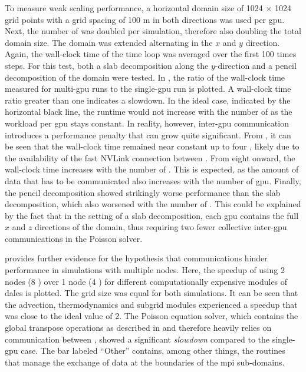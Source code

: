 To measure weak scaling performance, a horizontal domain size of 1024 $\times$ 1024 grid points with a grid spacing of 100 m in both directions was used per \acrshort{gpu}. Next, the number of  was doubled per simulation, therefore also doubling the total domain size. The domain was extended alternating in the $x$ and $y$ direction. Again, the wall-clock time of the time loop was averaged over the first 100 times steps. For this test, both a slab decomposition along the $y$-direction and a pencil decomposition of the domain were tested. In , the ratio of the wall-clock time measured for multi-\acrshort{gpu} runs to the single-\acrshort{gpu} run is plotted. A wall-clock time ratio greater than one indicates a slowdown. In the ideal case, indicated by the horizontal black line, the runtime would not increase with the number of  as the workload per \acrshort{gpu} stays constant. In reality, however, inter-\acrshort{gpu} communication introduces a performance penalty that can grow quite significant. From , it can be seen that the wall-clock time remained near constant up to four , likely due to the availability of the fast NVLink connection between . From eight  onward, the wall-clock time increases with the number of . This is expected, as the amount of data that has to be communicated also increases with the number of \acrshort{gpu}. Finally, the pencil decomposition showed strikingly worse performance than the slab decomposition, which also worsened with the number of . This could be explained by the fact that in the setting of a slab decomposition, each \acrshort{gpu} contains the full $x$ and $z$ directions of the domain, thus requiring two fewer collective inter-\acrshort{gpu} communications in the Poisson solver.

 provides further evidence for the hypothesis that communications hinder performance in simulations with multiple nodes. Here, the speedup of using 2 nodes (8 ) over 1 node (4 ) for different computationally expensive modules of \acrshort{dales} is plotted. The grid size was equal for both simulations. It can be seen that the advection, thermodynamics and subgrid modules experienced a speedup that was close to the ideal value of 2. The Poisson equation solver, which contains the global transpose operations as described in  and therefore heavily relies on communication between , showed a significant \emph{slowdown} compared to the single-\acrshort{gpu} case. The bar labeled ``Other'' contains, among other things, the routines that manage the exchange of data at the boundaries of the \acrshort{mpi} sub-domains. 


